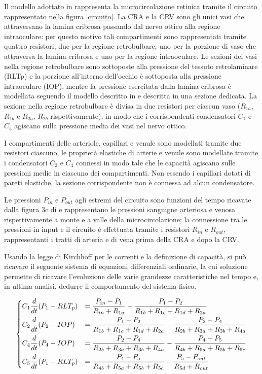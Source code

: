 \documentclass{article}
\begin{document}
Il modello adottato in \cite{art1} rappresenta la microcircolazione retinica tramite il circuito rappresentato nella figura \ref{circuito}.
La CRA e la CRV sono gli unici vasi che attraversano la lamina cribrosa passando dal nervo ottico alla regione intraoculare: per questo motivo tali compartimenti sono rappresentati tramite quattro resistori, due per la regione retrobulbare, uno per la porzione di vaso che attraversa la lamina cribrosa e uno per la regione intraoculare.
Le sezioni dei vasi nella regione retrobulbare sono sottoposte alla pressione del tessuto retrolaminare (RLTp) e la porzione all'interno dell'occhio è sottoposta alla pressione intraoculare (IOP), mentre la pressione esercitata dalla lamina cribrosa è modellata seguendo il modello descritto in \cite{art3} e descritta in una sezione dedicata.
La sezione nella regione retrobulbare è divisa in due resistori per ciascun vaso ($R_{1a}$, $R_{1b}$ e $R_{2a}$, $R_{2b}$ rispettivamente), in modo che i corrispondenti condensatori $C_1$ e $C_5$ agiscano sulla pressione media dei vasi nel nervo ottico.

I compartimenti delle arteriole, capillari e venule sono modellati tramite due resistori ciascuno, le proprietà elastiche di arterie e venule sono modellate tramite i condensatori $C_2$ e $C_4$ connessi in modo tale che le capacità agiscano sulle pressioni medie in ciascuno dei compartimenti.
Non essendo i capillari dotati di pareti elastiche, la sezione corrispondente non è connessa ad alcun condensatore.

Le pressioni $P_{in}$ e $P_{out}$ agli estremi del circuito sono funzioni del tempo  ricavate dalla figura 3c di \cite{art1} e rappresentano le pressioni sanguigne arteriosa e venosa rispettivamente a monte e a valle della microcircolazione; la connessione tra le pressioni in input e il circuito è effettuata tramite i resistori $R_{in}$ e $R_{out}$, rappresentanti i tratti di arteria e di vena prima della CRA e dopo la CRV.

Usando la legge di Kirchhoff per le correnti e la definizione di capacità, si può ricavare il seguente sistema di equazioni differenziali ordinarie, la cui soluzione permette di ricavare l'evoluzione delle varie grandezze caratteristiche nel tempo e, in ultima analisi, dedurre il comportamento del sistema fisico.

\begin{equation}
\begin{dcases}
  C_1 \frac{d}{dt}(P_1 - RLT_p) &= \frac{P_{in} - P_1}{R_{in} + R_{1a}}  - \frac{P_1 - P_2}{R_{1b} + R_{1c} + R_{1d} + R_{2a}} \\
  C_2 \frac{d}{dt}(P_2 - IOP) &= \frac{P_1 - P_2}{R_{1b} + R_{1c} + R_{1d} + R_{2a}}  - \frac{P_2 - P_4}{R_{2b} + R_{3a} + R_{3b} + R_{4a}} \\
  C_4 \frac{d}{dt}(P_4 - IOP) &= \frac{P_2 - P_4}{R_{2b} + R_{3a} + R_{3b} + R_{4a}}  - \frac{P_4 - P_5}{R_{4b} + R_{5a} + R_{5b} + R_{5c}} \\
  C_5 \frac{d}{dt}(P_1 - RLT_p) &= \frac{P_4 - P_5}{R_{4b} + R_{5a} + R_{5b} + R_{5c}}  - \frac{P_5 - P_{out}}{R_{5d} + R_{out}}
\end{dcases}
\label{sistema}
\end{equation}
\end{document}
